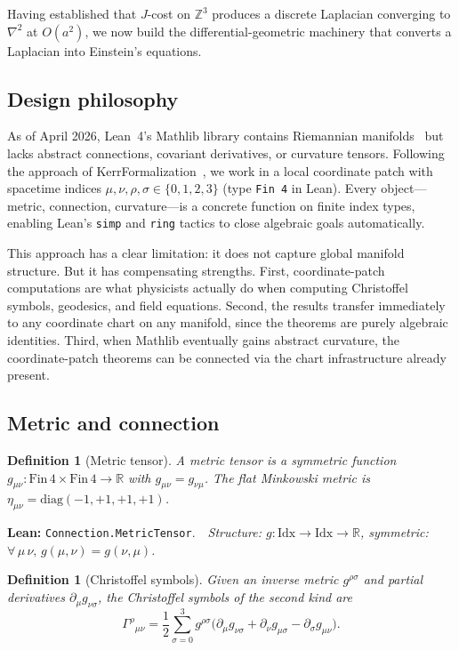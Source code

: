 \documentclass[11pt,a4paper]{article}
\newtheorem{definition}[theorem]{Definition}
\newcommand{\Jcost}{J}
\newcommand{\ZZ}{\mathbb{Z}}
\newcommand{\RR}{\mathbb{R}}
\newcommand{\lean}[1]{\texttt{#1}}
\newcommand{\leanref}[2]{\noindent\textbf{Lean:} \lean{#1}.\ \ \textit{#2}}
\begin{document}
Having established that $\Jcost$-cost on $\ZZ^3$ produces a discrete Laplacian converging to $\nabla^2$ at $O(a^2)$, we now build the differential-geometric machinery that converts a Laplacian into Einstein's equations.

\subsection{Design philosophy}

As of April 2026, Lean~4's Mathlib library contains Riemannian manifolds~\cite{Gouezel2025} but lacks abstract connections, covariant derivatives, or curvature tensors.
Following the approach of KerrFormalization~\cite{Iqbal2026}, we work in a local coordinate patch with spacetime indices $\mu,\nu,\rho,\sigma \in \{0,1,2,3\}$ (type \lean{Fin\,4} in Lean).
Every object---metric, connection, curvature---is a concrete function on finite index types, enabling Lean's \texttt{simp} and \texttt{ring} tactics to close algebraic goals automatically.

This approach has a clear limitation: it does not capture global manifold structure.
But it has compensating strengths.
First, coordinate-patch computations are what physicists actually do when computing Christoffel symbols, geodesics, and field equations.
Second, the results transfer immediately to any coordinate chart on any manifold, since the theorems are purely algebraic identities.
Third, when Mathlib eventually gains abstract curvature, the coordinate-patch theorems can be connected via the chart infrastructure already present.

\subsection{Metric and connection}

\begin{definition}[Metric tensor]
\label{def:metric}
A \emph{metric tensor} is a symmetric function $g_{\mu\nu} : \mathrm{Fin}\,4 \times \mathrm{Fin}\,4 \to \RR$ with $g_{\mu\nu} = g_{\nu\mu}$.
The flat Minkowski metric is $\eta_{\mu\nu} = \mathrm{diag}(-1,+1,+1,+1)$.
\end{definition}

\leanref{Connection.MetricTensor}{Structure: $g : \mathrm{Idx} \to \mathrm{Idx} \to \RR$, symmetric: $\forall\,\mu\,\nu,\, g(\mu,\nu) = g(\nu,\mu)$.}

\begin{definition}[Christoffel symbols]
\label{def:christoffel}
Given an inverse metric $g^{\rho\sigma}$ and partial derivatives $\partial_\mu g_{\nu\sigma}$, the Christoffel symbols of the second kind are
\begin{equation}\label{eq:christoffel}
\Gamma^\rho{}_{\mu\nu} = \frac{1}{2}\sum_{\sigma=0}^{3} g^{\rho\sigma}\bigl(\partial_\mu g_{\nu\sigma} + \partial_\nu g_{\mu\sigma} - \partial_\sigma g_{\mu\nu}\bigr).
\end{equation}
\end{definition}
\end{document}
